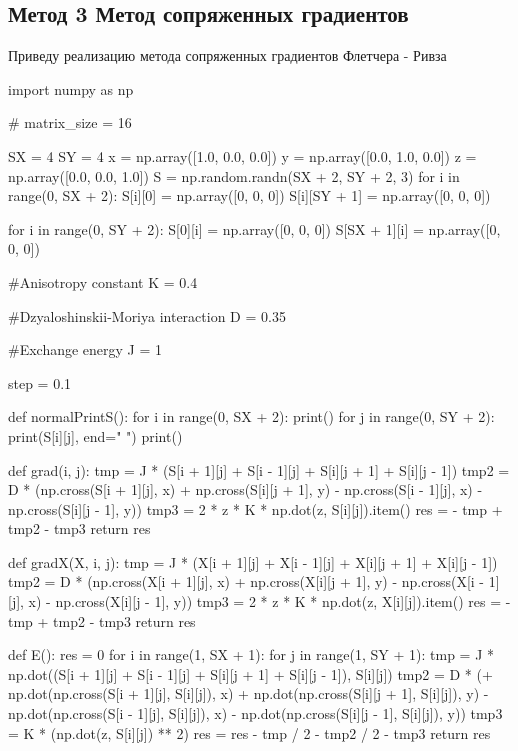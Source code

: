 \documentclass[ 12pt,x11names]{article}
\begin{document}
\subsection{Метод 3 Метод сопряженных градиентов}
 Приведу реализацию метода сопряженных градиентов Флетчера - Ривза
 \begin{python}
import numpy as np

# matrix_size = 16


SX = 4
SY = 4
x = np.array([1.0, 0.0, 0.0])
y = np.array([0.0, 1.0, 0.0])
z = np.array([0.0, 0.0, 1.0])
S = np.random.randn(SX + 2, SY + 2, 3)
for i in range(0, SX + 2):
    S[i][0] = np.array([0, 0, 0])
    S[i][SY + 1] = np.array([0, 0, 0])

for i in range(0, SY + 2):
    S[0][i] = np.array([0, 0, 0])
    S[SX + 1][i] = np.array([0, 0, 0])

#Anisotropy constant
K = 0.4

#Dzyaloshinskii-Moriya interaction
D = 0.35

#Exchange energy
J = 1

step = 0.1

def normalPrintS():
    for i in range(0, SX + 2):
        print()
        for j in range(0, SY + 2):
            print(S[i][j], end=" ")
    print()


def grad(i, j):
    tmp = J * (S[i + 1][j] + S[i - 1][j] +
               S[i][j + 1] + S[i][j - 1])
    tmp2 = D * (np.cross(S[i + 1][j], x)
               + np.cross(S[i][j + 1], y)
               - np.cross(S[i - 1][j], x)
               - np.cross(S[i][j - 1], y))
    tmp3 = 2 * z * K * np.dot(z, S[i][j]).item()
    res = - tmp + tmp2 - tmp3
    return res

def gradX(X, i, j):
    tmp = J * (X[i + 1][j] + X[i - 1][j]
             + X[i][j + 1] + X[i][j - 1])
    tmp2 = D * (np.cross(X[i + 1][j], x)
        + np.cross(X[i][j + 1], y)
        - np.cross(X[i - 1][j], x)
        - np.cross(X[i][j - 1], y))
        tmp3 = 2 * z * K * np.dot(z, X[i][j]).item()
    res = - tmp + tmp2 - tmp3
    return res



def E():
    res = 0
    for i in range(1, SX + 1):
        for j in range(1, SY + 1):
            tmp = J * np.dot((S[i + 1][j] + S[i - 1][j]
            + S[i][j + 1] + S[i][j - 1]), S[i][j])
            tmp2 = D * (+ np.dot(np.cross(S[i + 1][j], S[i][j]), x)
                        + np.dot(np.cross(S[i][j + 1], S[i][j]), y)
                        - np.dot(np.cross(S[i - 1][j], S[i][j]), x)
                        - np.dot(np.cross(S[i][j - 1], S[i][j]), y))
            tmp3 = K * (np.dot(z, S[i][j]) ** 2)
            res = res - tmp / 2 - tmp2 / 2 - tmp3
    return res


\end{python}
\end{document}
